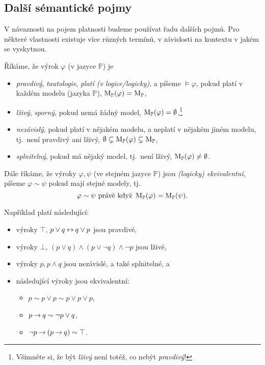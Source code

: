 \subsection{Další sémantické pojmy}

V návaznosti na pojem platnosti budeme používat řadu dalších pojmů. Pro některé vlastnosti existuje více různých termínů, v závislosti na kontextu v jakém se vyskytnou.

\begin{definition}\label{definition:semantic-notions}
Říkáme, že výrok $\varphi$ (v jazyce $\mathbb P$) je
\begin{itemize}
    \item \emph{pravdivý}, \emph{tautologie}, \emph{platí (v logice/logicky)}, a píšeme $\models \varphi$, pokud platí v každém modelu (jazyka $\mathbb P$), $\operatorname{M}_\mathbb P(\varphi)=\operatorname{M}_\mathbb P$,
    \item \emph{lživý}, \emph{sporný}, pokud nemá žádný model, $\operatorname{M}_\mathbb P(\varphi)=\emptyset$.\footnote{Všimněte si, že být \emph{lživý} není totéž, co nebýt \emph{pravdivý}!}
    \item \emph{nezávislý}, pokud platí v nějakém modelu, a neplatí v nějakém jiném modelu, tj.\ není pravdivý ani lživý, $\emptyset\subsetneq\operatorname{M}_\mathbb P(\varphi)\subsetneq\operatorname{M}_\mathbb P$,
    \item \emph{splnitelný}, pokud má nějaký model, tj.\ není lživý, $\operatorname{M}_\mathbb P(\varphi)\neq\emptyset$.
\end{itemize}
Dále říkáme, že výroky $\varphi,\psi$ (ve stejném jazyce $\mathbb P$) jsou \emph{(logicky) ekvivalentní}, píšeme $\varphi\sim\psi$ pokud mají stejné modely, tj.\
$$
\varphi\sim\psi\text{ právě když }\operatorname{M}_\mathbb P(\varphi)=\operatorname{M}_\mathbb P(\psi).
$$
\end{definition}

\begin{example} Například platí následující:
    \begin{itemize}
        \item výroky $\top$, $p\lor q\mathbin{\leftrightarrow} q\lor p$ jsou pravdivé,
        \item výroky $\bot$, $(p\lor q)\land (p\lor \neg q)\land \neg p$ jsou lživé,
        \item výroky $p, p\land q$ jsou nezávislé, a také splnitelné, a
        \item následující výroky jsou ekvivalentní:
        \begin{itemize}
            \item $p\sim p\lor p\sim p\lor p\lor p$,
            \item $p\mathbin{\rightarrow} q\sim \neg p\lor q$,
            \item $\neg p \mathbin{\rightarrow} (p\mathbin{\rightarrow} q) \sim \top $.
        \end{itemize}
    \end{itemize}
\end{example}

